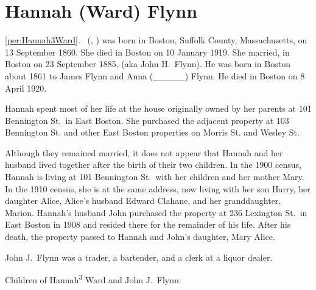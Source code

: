\section{Hannah (Ward) Flynn}

\ref{per:Hannah3Ward}.\  (, ) was born in Boston, Suffolk County, Massachusetts, on 13 September 1860.\cite{Hannah3WardBirth} She died in Boston on 10 January 1919.\cite{Hannah3WardDeath} She married, in Boston on 23 September 1885, \cite{Hannah3WardMarriage} (aka John H.\ Flynn\cite{JohnJHFlynn}). He was born in Boston about 1861 to James Flynn and Anna (\_\_\_\_\_) Flynn.\cite{Hannah3WardMarriage} He died in Boston on 8 April 1920.\cite{JohnFlynnDeath}

Hannah spent most of her life at the house originally owned by her parents at 101 Bennington St.\ in East Boston.\cite{101Bennington,Census1880DavidWard,Census1910HannahWard} She purchased the adjacent property at 103 Bennington St.\cite{103BenningtonSt} and other East Boston properties on Morris St.\cite{MorrisSt} and Wesley St.\cite{WesleySt} 

Although they remained married, it does not appear that Hannah and her husband lived together after the birth of their two children.\cite{HannahWardDirectories} In the 1900 census, Hannah is living at 101 Bennington St.\ with her children and her mother Mary.\cite{Census1900HannahWard} In the 1910 census, she is at the same address, now living with her son Harry, her daughter Alice, Alice's husband Edward Clahane, and her granddaughter, Marion.\cite{Census1910HannahWard} Hannah's husband John purchased the property at 236 Lexington St.\ in East Boston in 1908 and resided there for the remainder of his life.\cite{236Lexington,JohnFlynnDeath} After his death, the property passed to Hannah and John's daughter, Mary Alice.\cite{236Lexington2}

John J.\ Flynn was a trader,\cite{Hannah3WardMarriage} a bartender,\cite{Harry4FlynnBirth} and a clerk at a liquor dealer.\cite{JohnFlynn1889,BropheyLiquors}

\begin{KidsIntro}
	Children of Hannah\textsuperscript{3} Ward and John J.\ Flynn:
\end{KidsIntro}

